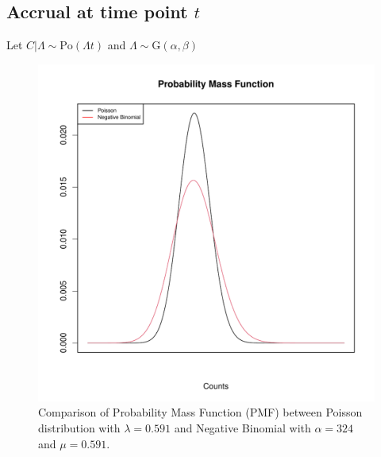 \subsection{Accrual at time point $t$}
Let $C|\Lambda \sim \textrm{Po}(\Lambda t)$ and $\Lambda \sim \textrm{G}(\alpha,\beta)$


\begin{figure}
\begin{knitrout}
\color{fgcolor}

{\centering \includegraphics[width=\textwidth-3cm]{figure/ch02_figunnamed-chunk-7-1} 

}


\end{knitrout}
  \caption{Comparison of Probability Mass Function (PMF) between Poisson distribution with $\lambda = 0.591$ and Negative Binomial with $\alpha = 324$ and $\mu = 0.591$.}
  \label{fig:2_6}
\end{figure}



